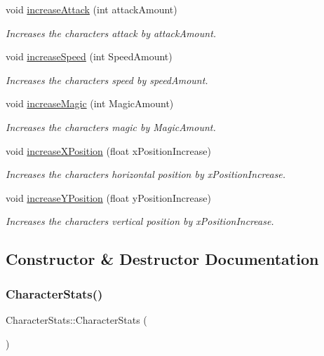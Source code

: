 \begin{DoxyCompactItemize}
void \mbox{\hyperlink{classCharacterStats_a5e9d5271f98b21c335cef1b3efe3ef2c}{increase\+Attack}} (int attack\+Amount)
\begin{DoxyCompactList}\small\item\em Increases the characters attack by attack\+Amount. \end{DoxyCompactList}\item 
void \mbox{\hyperlink{classCharacterStats_ad79f2f74380b875d11849baf1d43eefc}{increase\+Speed}} (int Speed\+Amount)
\begin{DoxyCompactList}\small\item\em Increases the characters speed by speed\+Amount. \end{DoxyCompactList}\item 
void \mbox{\hyperlink{classCharacterStats_aa596a2a54f57b7a637d7be5be50433bb}{increase\+Magic}} (int Magic\+Amount)
\begin{DoxyCompactList}\small\item\em Increases the characters magic by Magic\+Amount. \end{DoxyCompactList}\item 
void \mbox{\hyperlink{classCharacterStats_a5f2fe8f102dbed7cfd5ec6960f2a3ca2}{increase\+X\+Position}} (float x\+Position\+Increase)
\begin{DoxyCompactList}\small\item\em Increases the characters horizontal position by x\+Position\+Increase. \end{DoxyCompactList}\item 
void \mbox{\hyperlink{classCharacterStats_a991c8cf5304f633dcbce921b3daebbc4}{increase\+Y\+Position}} (float y\+Position\+Increase)
\begin{DoxyCompactList}\small\item\em Increases the characters vertical position by x\+Position\+Increase. \end{DoxyCompactList}\end{DoxyCompactItemize}


\subsection{Constructor \& Destructor Documentation}
\mbox{\label{classCharacterStats_a74e13afe074c52cad1c27ea426264540}} 
\subsubsection{\texorpdfstring{CharacterStats()}{CharacterStats()}\hspace{0.1cm}{\footnotesize\ttfamily [1/2]}}
{\footnotesize\ttfamily Character\+Stats\+::\+Character\+Stats (\begin{DoxyParamCaption}{ }\end{DoxyParamCaption})}



